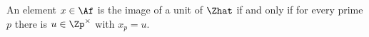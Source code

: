 An element $x\in\Af$ is the image of a unit of $\Zhat$ if and only if for every prime $p$ there is $u\in\Zp^\times$ with $x_p=u$.
